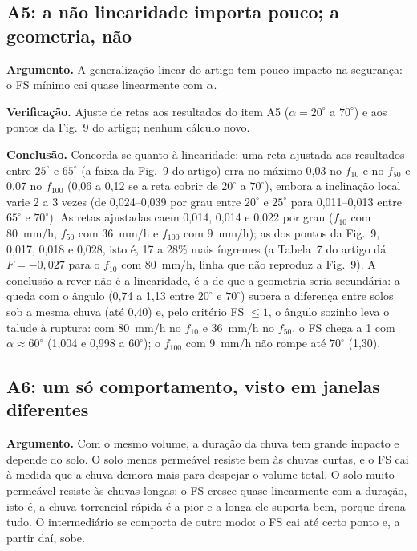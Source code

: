 \subsection{A5: a n\~ao linearidade importa pouco; a geometria, n\~ao}

\textbf{Argumento.} A generaliza\c{c}\~ao linear do artigo tem pouco impacto na seguran\c{c}a: o FS m\'inimo cai
quase linearmente com $\alpha$.

\textbf{Verifica\c{c}\~ao.} Ajuste de retas aos resultados do item A5 ($\alpha=20^\circ$ a $70^\circ$) e aos pontos da
Fig.~9 do artigo; nenhum c\'alculo novo.

\textbf{Conclus\~ao.} Concorda-se quanto \`a linearidade: uma reta ajustada aos resultados entre $25^\circ$ e
$65^\circ$ (a faixa da Fig.~9 do artigo) erra no m\'aximo 0,03 no $f_{10}$ e no $f_{50}$ e 0,07 no $f_{100}$ (0,06 a
0,12 se a reta cobrir de $20^\circ$ a $70^\circ$), embora a inclina\c{c}\~ao local varie 2 a 3 vezes (de 0,024--0,039
por grau entre $20^\circ$ e $25^\circ$ para 0,011--0,013 entre $65^\circ$ e $70^\circ$). As retas ajustadas caem
0,014, 0,014 e 0,022 por grau ($f_{10}$ com 80~mm/h, $f_{50}$ com 36~mm/h e $f_{100}$ com 9~mm/h); as dos pontos da
Fig.~9, 0,017, 0,018 e 0,028, isto \'e, 17 a 28\% mais \'ingremes (a Tabela~7 do artigo d\'a $F=-0{,}027$ para o
$f_{10}$ com 80~mm/h, linha que n\~ao reproduz a Fig.~9). A conclus\~ao a rever n\~ao \'e a linearidade, \'e a de que a
geometria seria secund\'aria: a queda com o \^angulo (0,74 a 1,13 entre $20^\circ$ e $70^\circ$) supera a diferen\c{c}a
entre solos sob a mesma chuva (at\'e 0,40) e, pelo crit\'erio FS $\le1$, o \^angulo sozinho leva o talude \`a ruptura:
com 80~mm/h no $f_{10}$ e 36~mm/h no $f_{50}$, o FS chega a 1 com $\alpha\approx60^\circ$ (1,004 e 0,998 a $60^\circ$);
o $f_{100}$ com 9~mm/h n\~ao rompe at\'e $70^\circ$ (1,30).

\subsection{A6: um s\'o comportamento, visto em janelas diferentes}

\textbf{Argumento.} Com o mesmo volume, a dura\c{c}\~ao da chuva tem grande impacto e depende do solo. O solo menos
perme\'avel resiste bem \`as chuvas curtas, e o FS cai \`a medida que a chuva demora mais para despejar o volume total.
O solo muito perme\'avel resiste \`as chuvas longas: o FS cresce quase linearmente com a dura\c{c}\~ao, isto \'e, a
chuva torrencial r\'apida \'e a pior e a longa ele suporta bem, porque drena tudo. O intermedi\'ario se comporta de
outro modo: o FS cai at\'e certo ponto e, a partir da\'i, sobe.

